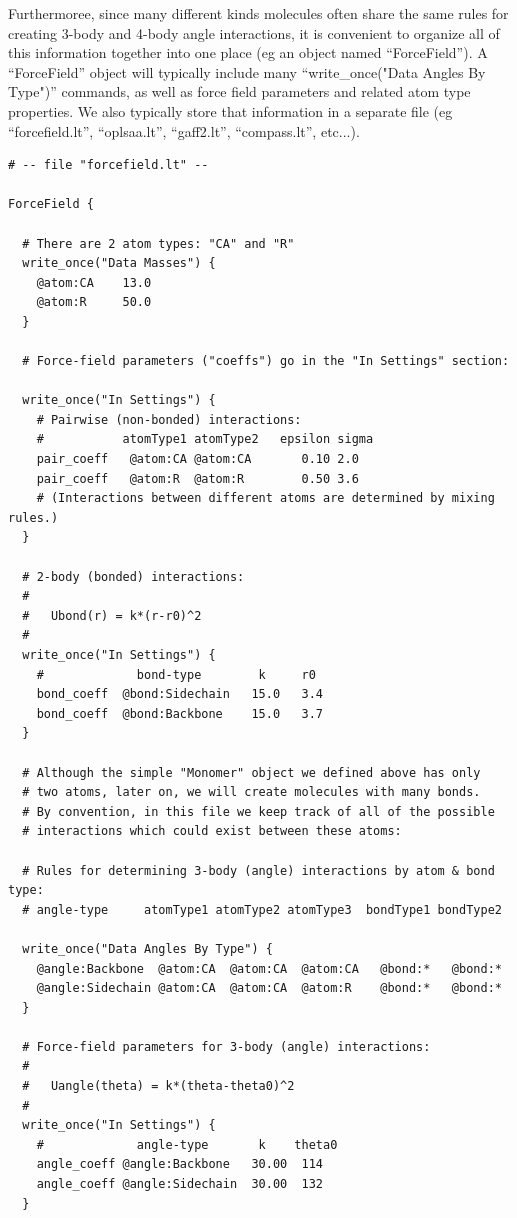\documentclass[11pt]{article}
\begin{document}
Furthermoree, since many different kinds molecules often share
the same rules for creating 3-body and 4-body angle interactions,
it is convenient to organize all of this information
together into one place (eg an object named ``ForceField'').
A ``ForceField'' object will typically include many
``write\_once("Data Angles By Type")''
commands, as well as force field parameters and related atom type properties.
We also typically store that information in a separate file
(eg ``forcefield.lt'', ``oplsaa.lt'', ``gaff2.lt'', ``compass.lt'', etc...).

\begin{verbatim}
# -- file "forcefield.lt" --

ForceField {

  # There are 2 atom types: "CA" and "R"
  write_once("Data Masses") {
    @atom:CA    13.0
    @atom:R     50.0
  }

  # Force-field parameters ("coeffs") go in the "In Settings" section:

  write_once("In Settings") {
    # Pairwise (non-bonded) interactions:
    #           atomType1 atomType2   epsilon sigma
    pair_coeff   @atom:CA @atom:CA       0.10 2.0
    pair_coeff   @atom:R  @atom:R        0.50 3.6
    # (Interactions between different atoms are determined by mixing rules.)
  }

  # 2-body (bonded) interactions:
  #
  #   Ubond(r) = k*(r-r0)^2
  #
  write_once("In Settings") {
    #             bond-type        k     r0
    bond_coeff  @bond:Sidechain   15.0   3.4
    bond_coeff  @bond:Backbone    15.0   3.7
  }

  # Although the simple "Monomer" object we defined above has only
  # two atoms, later on, we will create molecules with many bonds.
  # By convention, in this file we keep track of all of the possible
  # interactions which could exist between these atoms:

  # Rules for determining 3-body (angle) interactions by atom & bond type:
  # angle-type     atomType1 atomType2 atomType3  bondType1 bondType2

  write_once("Data Angles By Type") {
    @angle:Backbone  @atom:CA  @atom:CA  @atom:CA   @bond:*   @bond:*
    @angle:Sidechain @atom:CA  @atom:CA  @atom:R    @bond:*   @bond:*
  }

  # Force-field parameters for 3-body (angle) interactions:
  #
  #   Uangle(theta) = k*(theta-theta0)^2
  #
  write_once("In Settings") {
    #             angle-type       k    theta0
    angle_coeff @angle:Backbone   30.00  114
    angle_coeff @angle:Sidechain  30.00  132
  }


\end{verbatim}
\end{document}
